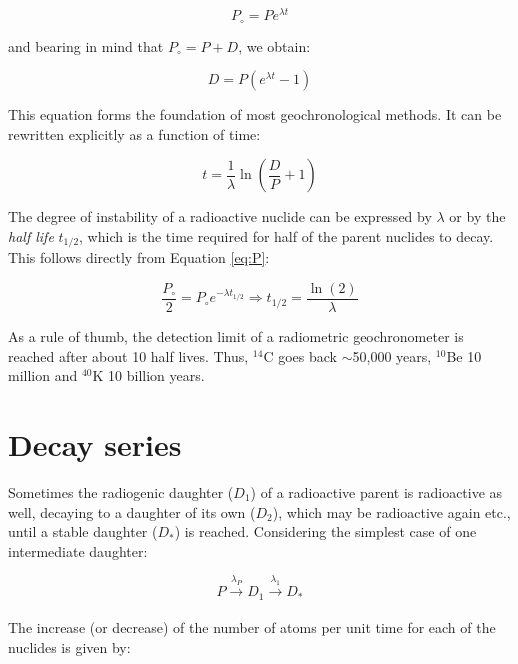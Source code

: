 \documentclass{book}
\begin{document}
\begin{equation}
P_\circ = P e^{\lambda t}
\label{eq:P0}
\end{equation}

and bearing in mind that $P_\circ = P + D$, we obtain:

\begin{equation}
D = P (e^{\lambda t}- 1)
\label{eq:D}
\end{equation}

This equation forms the foundation of most geochronological
methods. It can be rewritten explicitly as a function of time:

\begin{equation}
t = \frac{1}{\lambda} \ln\left(\frac{D}{P} + 1\right)
\label{eq:t}
\end{equation}

The degree of instability of a radioactive nuclide can be expressed by
$\lambda$ or by the \emph{half life} $t_{1/2}$, which is the time
required for half of the parent nuclides to decay. This follows
directly from Equation \ref{eq:P}:

\begin{equation}
\frac{P_\circ}{2} = P_\circ e^{-\lambda t_{1/2}} 
\Rightarrow t_{1/2} = \frac{\ln(2)}{\lambda}
\label{eq:T12}
\end{equation}

As a rule of thumb, the detection limit of a radiometric
geo\-chro\-no\-me\-ter is reached after about 10 half lives. Thus,
$^{14}$C goes back $\sim$50,000 years, $^{10}$Be 10 million and
$^{40}$K 10 billion years.

\section{Decay series}
\label{sec:decay-series}

Sometimes the radiogenic daughter ($D_1$) of a radioactive parent is
radioactive as well, decaying to a daughter of its own ($D_2$), which
may be radioactive again etc., until a stable daughter ($D_*$) is
reached. Considering the simplest case of one intermediate daughter:

\begin{equation}
P \xrightarrow[]{\lambda_P} D_1 \xrightarrow[]{\lambda_1} D_*
\label{eq:series}
\end{equation}

The increase (or decrease) of the number of atoms per unit time for
each of the nuclides is given by:
\end{document}

